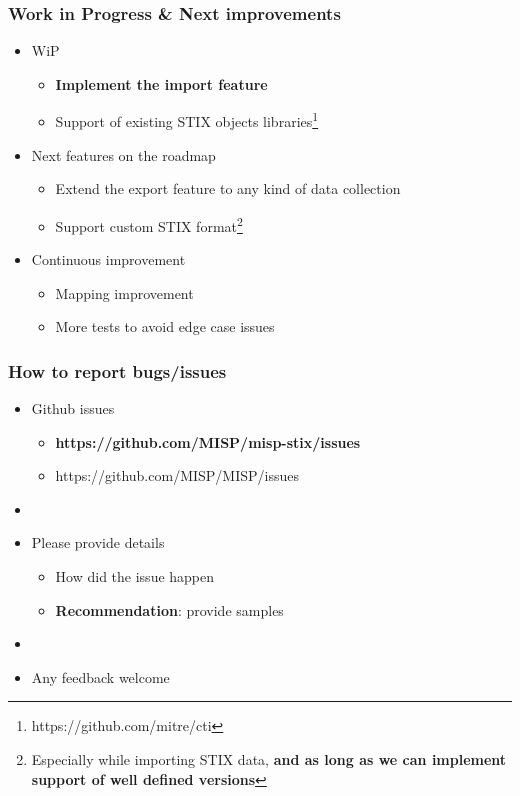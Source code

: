 \begin{frame}
    \frametitle{Work in Progress \& Next improvements}
    \begin{itemize}
        \item WiP
        \begin{itemize}
            \item {\bf Implement the import feature}
            \item Support of existing STIX objects libraries\footnote{https://github.com/mitre/cti}
        \end{itemize}
        \item Next features on the roadmap
        \begin{itemize}
            \item Extend the export feature to any kind of data collection
            \item Support custom STIX format\footnote{Especially while importing STIX data, {\bf and as long as we can implement support of well defined versions}}
        \end{itemize}
        \item Continuous improvement
        \begin{itemize}
            \item Mapping improvement
            \item More tests to avoid edge case issues
        \end{itemize}
    \end{itemize}
\end{frame}

\begin{frame}
    \frametitle{How to report bugs/issues}
    \begin{itemize}
        \item Github issues
        \begin{itemize}
            \item {\bf https://github.com/MISP/misp-stix/issues}
            \item https://github.com/MISP/MISP/issues
        \end{itemize}
        \item []
        \item Please provide details
        \begin{itemize}
            \item How did the issue happen
            \item {\bf Recommendation}: provide samples
        \end{itemize}
        \item[]
        \item Any feedback welcome
    \end{itemize}
\end{frame}

